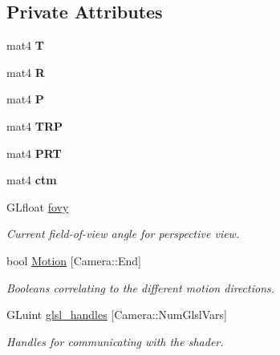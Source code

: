 \subsection*{\-Private \-Attributes}
\begin{DoxyCompactItemize}
\item 
\hypertarget{class_camera_aa4cb92b539c9a9707a12d7025ed889f6}{mat4 {\bfseries \-T}}\label{class_camera_aa4cb92b539c9a9707a12d7025ed889f6}

\item 
\hypertarget{class_camera_a8fd028120b18556c43ad86756e637fbc}{mat4 {\bfseries \-R}}\label{class_camera_a8fd028120b18556c43ad86756e637fbc}

\item 
\hypertarget{class_camera_a0bee6fbae6ec5960850a5fb858f3912a}{mat4 {\bfseries \-P}}\label{class_camera_a0bee6fbae6ec5960850a5fb858f3912a}

\item 
\hypertarget{class_camera_a2ec15fbfe495b11f60b68726d5a22bb9}{mat4 {\bfseries \-T\-R\-P}}\label{class_camera_a2ec15fbfe495b11f60b68726d5a22bb9}

\item 
\hypertarget{class_camera_a6f5bb6e124f8e4bbfd163a2cb2f505dd}{mat4 {\bfseries \-P\-R\-T}}\label{class_camera_a6f5bb6e124f8e4bbfd163a2cb2f505dd}

\item 
\hypertarget{class_camera_a9b1e81e3f5531390bb6a599dca0d2444}{mat4 {\bfseries ctm}}\label{class_camera_a9b1e81e3f5531390bb6a599dca0d2444}

\item 
\-G\-Lfloat \hyperlink{class_camera_acc8b97facc57059530efad534c2f8314}{fovy}
\begin{DoxyCompactList}\small\item\em \-Current field-\/of-\/view angle for perspective view. \end{DoxyCompactList}\item 
bool \hyperlink{class_camera_a39746b4fadf30bba6bdc8aa6acfdc6f2}{\-Motion} \mbox{[}\-Camera\-::\-End\mbox{]}
\begin{DoxyCompactList}\small\item\em \-Booleans correlating to the different motion directions. \end{DoxyCompactList}\item 
\-G\-Luint \hyperlink{class_camera_a1635486d7f9e0d52b241899a270ee335}{glsl\-\_\-handles} \mbox{[}\-Camera\-::\-Num\-Glsl\-Vars\mbox{]}
\begin{DoxyCompactList}\small\item\em \-Handles for communicating with the shader. \end{DoxyCompactList}\end{DoxyCompactItemize}


